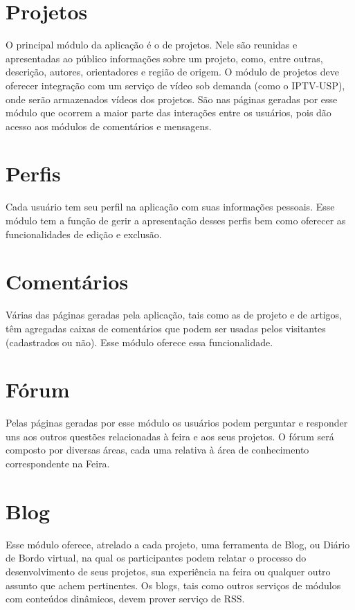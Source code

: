 \documentclass[a4paper,12pt,font=plain,header=plain]{abnt}
\begin{document}
		\section{Projetos}
		O principal módulo da aplicação é o de projetos. Nele são reunidas e apresentadas ao público informações sobre um projeto, como, entre outras, descrição, autores, orientadores e região de origem. O módulo de projetos deve oferecer integração com um serviço de vídeo sob demanda (como o IPTV-USP), onde serão armazenados vídeos dos projetos. São nas páginas geradas por esse módulo que ocorrem a maior parte das interações entre os usuários, pois dão acesso aos módulos de comentários e mensagens.
		
		\section{Perfis}
		Cada usuário tem seu perfil na aplicação com suas informações pessoais. Esse módulo tem a função de gerir a apresentação desses perfis bem como oferecer as funcionalidades de edição e exclusão.
		
		\section{Comentários}
		Várias das páginas geradas pela aplicação, tais como as de projeto e de artigos, têm agregadas caixas de comentários que podem ser usadas pelos visitantes (cadastrados ou não). Esse módulo oferece essa funcionalidade.
	
		\section{Fórum}
		Pelas páginas geradas por esse módulo os usuários podem perguntar e responder uns aos outros questões relacionadas à feira e aos seus projetos. O fórum será composto por diversas áreas, cada uma relativa à área de conhecimento correspondente na Feira.
		
		\section{Blog}
		Esse módulo oferece, atrelado a cada projeto, uma ferramenta de Blog, ou Diário de Bordo virtual, na qual os participantes podem relatar o processo do desenvolvimento de seus projetos, sua experiência na feira ou qualquer outro assunto que achem pertinentes. Os blogs, tais como outros serviços de módulos com conteúdos dinâmicos, devem prover serviço de RSS.
		
\end{document}
